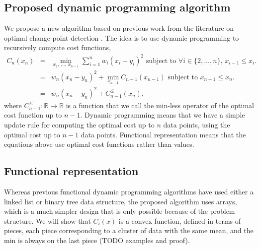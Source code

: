 \documentclass[12pt]{article}
\begin{document}
\subsection{Proposed dynamic programming algorithm}
We propose a new algorithm based on previous work from the literature on optimal change-point detection \citep{Hocking2020jmlr}.
The idea is to use dynamic programming to recursively compute cost functions,
\begin{eqnarray}
    \label{eq:Cn_mu}
  C_n(x_n) &= & \min_{x_1,\, \dots,\, x_{n-1}}  \sum_{i=1}^n w_i(x_i-y_i)^2 \text{ subject to } \forall i\in\{2, \dots, n\},\, x_{i-1} \leq x_{i}.\\
           &=& w_n(x_n-y_n)^2 + \min_{x_{n-1}} C_{n-1}(x_{n-1}) \text{ subject to } x_{n-1}\leq x_n.\\
  &=& w_n(x_n-y_n)^2 + C_{n-1}^\leq(x_{n}),
\end{eqnarray}
where $C_{n-1}^\leq : \mathbb R \rightarrow \mathbb R$ is a function that we call the min-less operator of the optimal cost function up to $n-1$.
Dynamic programming means that we have a simple update rule for computing the optimal cost up to $n$ data points, using the optimal cost up to $n-1$ data points.
Functional representation means that the equations above use optimal cost functions rather than values.

\subsection{Functional representation}

Whereas previous functional dynamic programming algorithms have used either a linked list or binary tree data structure, the proposed algorithm uses arrays, which is a much simpler design that is only possible because of the problem structure.
We will show that $C_i(x)$ is a convex function, defined in terms of pieces, each piece corresponding to a cluster of data with the same mean, and the min is always on the last piece (TODO examples and proof).
\end{document}
